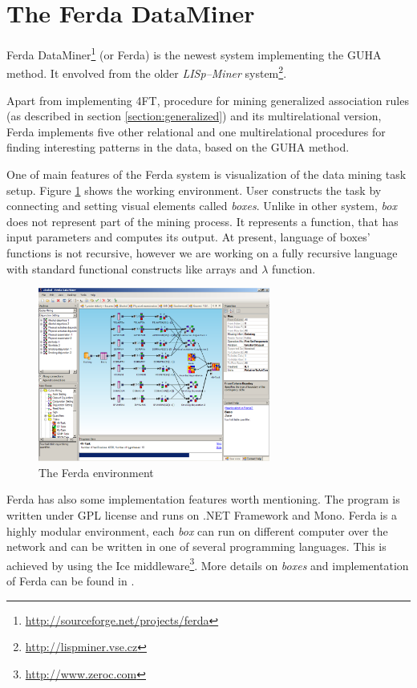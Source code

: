 \documentclass[conference]{IEEEtran}
\begin{document}
\section{The Ferda DataMiner}
\label{section:ferda}
Ferda DataMiner\footnote{\url{http://sourceforge.net/projects/ferda}} (or Ferda)
is the newest system implementing the GUHA method\cite{GUHA1, GUHA2}.
It envolved from the older \emph{LISp--Miner} 
system\footnote{\url{http://lispminer.vse.cz}}. 

Apart from implementing 4FT, procedure for mining generalized association
rules (as described in section \ref{section:generalized}) and its multirelational 
version, Ferda implements five other relational and one multirelational 
procedures for finding interesting patterns in the data, based on the GUHA 
method. 

One of main features of the Ferda system is visualization of the data mining task
setup. Figure \ref{fig:environment} shows the working environment. User constructs
the task by connecting and setting visual elements called \emph{boxes}. Unlike in
other system, \emph{box} does not represent part of the mining process. It represents
a function, that has input parameters and computes its output. At present, language
of boxes' functions is not recursive, however we are working on a fully recursive
language with standard functional constructs like arrays and $\lambda$ function. 

\begin{figure}[!t]
\centering
\includegraphics[width=3in]{ferda.eps}
\caption{The Ferda environment}
\label{fig:environment}
\end{figure}

Ferda has also some implementation features worth mentioning. The program is written
under GPL license and runs on .NET Framework and Mono. Ferda is a highly modular 
environment, each \emph{box} can run on different computer over the network and can
be written in one of several programming languages. This is achieved by using the Ice
middleware\footnote{\url{http://www.zeroc.com}}. More details on \emph{boxes} 
and implementation of Ferda can be found in \cite{Ferda}.
\end{document}
